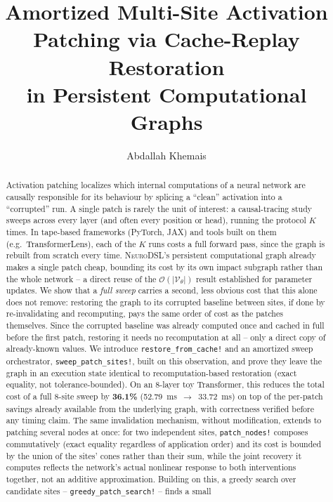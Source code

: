 \documentclass{article}
\title{Amortized Multi-Site Activation Patching via Cache-Replay Restoration\\in Persistent Computational Graphs}
\author{Abdallah Khemais}
\date{}
\begin{document}
\maketitle

\begin{abstract}
Activation patching localizes which internal computations of a neural network are causally
responsible for its behaviour by splicing a ``clean'' activation into a ``corrupted'' run. A
single patch is rarely the unit of interest: a causal-tracing study sweeps across every layer
(and often every position or head), running the protocol $K$ times. In tape-based frameworks
(PyTorch, JAX) and tools built on them (e.g.\ TransformerLens), each of the $K$ runs costs a full
forward pass, since the graph is rebuilt from scratch every time. \textsc{NeuroDSL}'s persistent
computational graph already makes a single patch cheap, bounding its cost by its own impact
subgraph rather than the whole network -- a direct reuse of the
$\mathcal{O}(|\mathcal{V}_{\theta}|)$ result established for parameter updates. We show that a
\emph{full sweep} carries a second, less obvious cost that this alone does not remove: restoring
the graph to its corrupted baseline between sites, if done by re-invalidating and recomputing,
pays the same order of cost as the patches themselves. Since the corrupted baseline was already
computed once and cached in full before the first patch, restoring it needs no recomputation at
all -- only a direct copy of already-known values. We introduce \texttt{restore\_from\_cache!}
and an amortized sweep orchestrator, \texttt{sweep\_patch\_sites!}, built on this observation, and
prove they leave the graph in an execution state identical to recomputation-based restoration
(exact equality, not tolerance-bounded). On an 8-layer toy Transformer, this reduces the total
cost of a full 8-site sweep by \textbf{36.1\%} (52.79~ms~$\to$~33.72~ms) on top of the
per-patch savings already available from the underlying graph, with correctness verified before
any timing claim. The same invalidation mechanism, without modification, extends to patching
several nodes at once: for two independent sites, \texttt{patch\_nodes!} composes commutatively
(exact equality regardless of application order) and its cost is bounded by the union of the
sites' cones rather than their sum, while the joint recovery it computes reflects the network's
actual nonlinear response to both interventions together, not an additive approximation. Building
on this, a greedy search over candidate sites -- \texttt{greedy\_patch\_search!} -- finds a small

\end{abstract}
\end{document}
